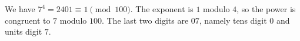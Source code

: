 We have $7^4=2401\equiv1\pmod {100}$. The exponent is $1$ modulo $4$, so the power is congruent to $7$ modulo $100$. The last two digits are $\boxed{07}$, namely tens digit $0$ and units digit $7$.
